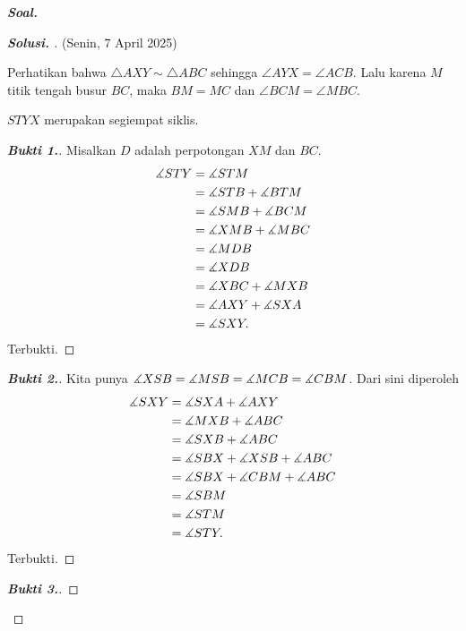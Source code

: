 \textbf{\textit{Soal.}} 

\begin{proof}[\textbf{Solusi. }] (Senin, 7 April 2025) 
    
    Perhatikan bahwa $\triangle AXY \sim \triangle ABC$ sehingga $\angle AYX = \angle ACB$. Lalu karena $M$ titik tengah busur $BC$, maka $BM=MC$ dan $\angle BCM = \angle MBC$.
    \begin{lemmarev}
        $STYX$ merupakan segiempat siklis.
    \end{lemmarev}
    \begin{proof}[\textbf{Bukti 1.}]
        Misalkan $D$ adalah perpotongan $XM$ dan $BC$.
       \begin{align*}
        \measuredangle STY &= \measuredangle STM\\
        &= \measuredangle STB + \measuredangle BTM\\
        &= \measuredangle SMB + \measuredangle BCM\\
        &= \measuredangle XMB + \measuredangle MBC\\
        &= \measuredangle MDB\\
        &= \measuredangle XDB\\
        &= \measuredangle XBC + \measuredangle MXB\\
        &= \measuredangle AXY + \measuredangle SXA\\
        &= \measuredangle SXY.
       \end{align*}
       Terbukti.
    \end{proof} 
    \begin{proof}[\textbf{Bukti 2.}]
        Kita punya $\measuredangle XSB = \measuredangle MSB = \measuredangle MCB = \measuredangle CBM$. Dari sini diperoleh
        \begin{align*}
            \measuredangle SXY &= \measuredangle SXA + \measuredangle AXY\\
            &= \measuredangle MXB + \measuredangle ABC\\
            &= \measuredangle SXB + \measuredangle ABC\\
            &= \measuredangle SBX + \measuredangle XSB + \measuredangle ABC\\
            &= \measuredangle SBX + \measuredangle CBM + \measuredangle ABC\\
            &= \measuredangle SBM\\
            &= \measuredangle STM\\
            &= \measuredangle STY.
        \end{align*}
        Terbukti.
    \end{proof}
    \begin{proof}[\textbf{Bukti 3.}]

\end{proof}
\end{proof}
